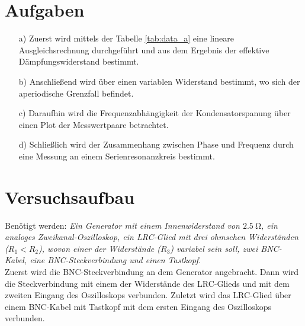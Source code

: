 
\section{Aufgaben}\justifying

 \begin{enumerate}

    \item[a)] \justifying Zuerst wird mittels der Tabelle \ref{tab:data_a} eine lineare
                          Ausgleichsrechnung durchgeführt und aus dem Ergebnis der effektive
                          Dämpfungswiderstand bestimmt.

    \item[b)] \justifying Anschließend wird über einen variablen Widerstand bestimmt,
                          wo sich der aperiodische Grenzfall befindet. 
  
    \item[c)] \justifying Daraufhin wird die Frequenzabhängigkeit
                          der Kondensatorspanung über einen Plot der Messwertpaare
                          betrachtet.
  
    \item[d)] \justifying Schließlich wird der Zusammenhang zwischen Phase und Frequenz
                          durch eine Messung an einem Serienresonanzkreis bestimmt.
    
  \end{enumerate}


\section{Versuchsaufbau}\justifying
Benötigt werden: \textit{Ein Generator mit einem Innenwiderstand von $\SI{2.5}{\ohm}$, 
ein analoges Zweikanal-Oszilloskop, ein LRC-Glied mit drei ohmschen Widerständen 
($R_1 < R_2$), wovon einer der Widerstände ($R_3$) variabel sein soll, 
zwei BNC-Kabel, eine BNC-Steckverbindung und einen Tastkopf}.\\
Zuerst wird die BNC-Steckverbindung an dem Generator angebracht. 
Dann wird die Steckverbindung mit einem der Widerstände des LRC-Glieds und mit dem zweiten 
Eingang des Oszilloskops verbunden.
Zuletzt wird das LRC-Glied über einem BNC-Kabel mit Tastkopf 
mit dem ersten Eingang des Oszilloskops verbunden.

